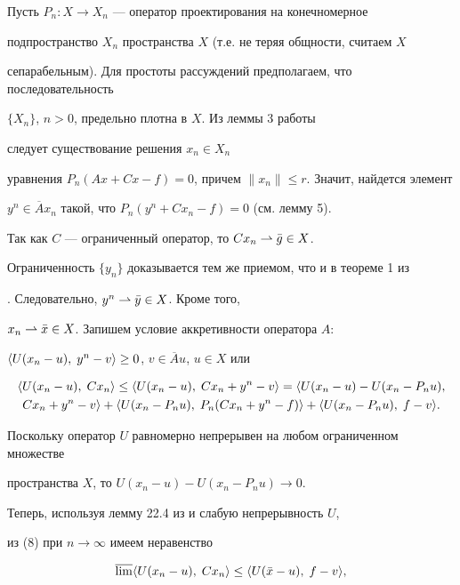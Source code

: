 \begin{pf} Пусть $P_n:X\to X_n$ --- оператор проектирования на конечномерное 


подпространство $X_n$ пространства $X$ (т.е. не теряя общности, считаем $X$ 


сепарабельным). Для простоты рассуждений предполагаем, что последовательность 


$\{X_n\}$, $n>0$, предельно плотна в $X$. Из леммы 3 работы \cite{Rya1} 


следует существование решения $x_n\in X_n$ 


уравнения $P_n(Ax+Cx-f)=0$, причем $\|x_n\|\le r$. Значит, найдется элемент 


$y^n\in\overline Ax_n$ такой, что $P_n(y^n+Cx_n-f)=0$ (см. лемму 5). 


 


Так как $C$ --- ограниченный оператор, то $Cx_n\rightharpoonup\Bar g\in X$. 


Ограниченность $\{y_n\}$ доказывается тем же приемом, что и в теореме 1 из 


\cite{Rya1}. Следовательно, $y^n\rightharpoonup\Bar y\in X$. Кроме того, 


$x_n\rightharpoonup\Bar x\in X$. Запишем условие аккретивности оператора $A$: 


$\langle U(x_n-u),\;y^n-v\rangle\ge 0$, $v\in \overline Au$, $u\in X$ или 


%


\begin{multline} 


\la U(x_n-u),\;Cx_n\ra\le \la U(x_n-u),\;Cx_n+y^n-v\ra= 


\la U(x_n-u)-U(x_n-P_nu),\\ 


Cx_n+y^n-v\ra +\la U(x_n-P_nu),\;P_n(Cx_n+y^n-f)\ra 


+\la U(x_n-P_nu),\;f-v\ra . 


\end{multline} 


Поскольку оператор $U$ равномерно непрерывен на любом ограниченном множестве 


пространства $X$, то $U(x_n-u)-U(x_n-P_nu)\to 0$. 


Теперь, используя лемму 22.4 из \cite{Vai} и слабую непрерывность $U$, 


из (8) при $n\to\infty$ имеем неравенство 


\begin{equation} 


\overline{\lim}\la U(x_n-u),\;Cx_n\ra \le \la U(\Bar x-u),\;f-v\ra , 



\end{equation}
\end{pf}
